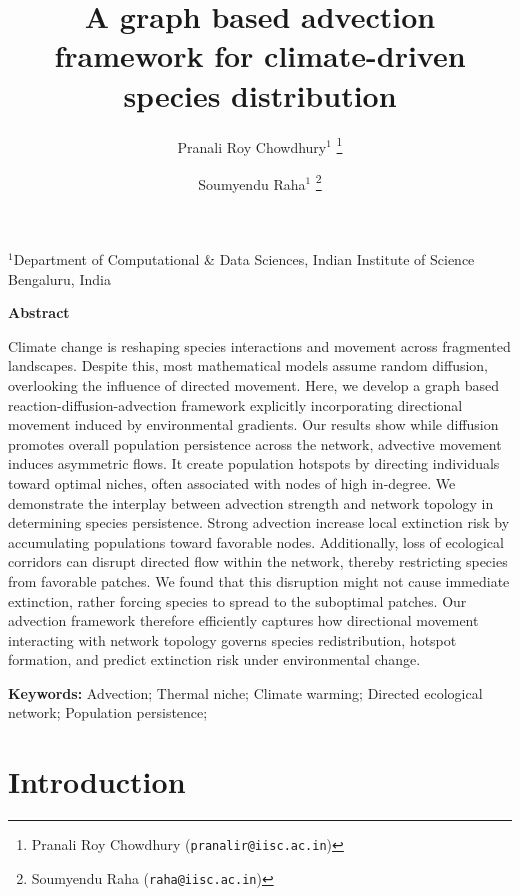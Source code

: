 \documentclass[12pt]{article}
\title{A graph based advection framework for climate-driven species distribution}
\author{
Pranali Roy Chowdhury$^1$ \thanks{ Pranali Roy Chowdhury (\texttt{pranalir@iisc.ac.in})} \and
Soumyendu Raha$^1$ \thanks{Soumyendu Raha (\texttt{raha@iisc.ac.in})}
}
\date{}
\begin{document}
\maketitle
\noindent{}  $^1$Department of Computational \& Data Sciences, Indian Institute of Science Bengaluru, India

\bigskip





\begin{center}
{\bf Abstract}
\end{center}
Climate change is reshaping species interactions and movement across fragmented landscapes. Despite this, most mathematical models assume random diffusion, overlooking the influence of directed movement. Here, we develop a graph based reaction-diffusion-advection framework explicitly incorporating directional movement induced by environmental gradients. Our results show while diffusion promotes overall population persistence across the network, advective movement induces asymmetric flows. It create population hotspots by directing individuals toward optimal niches, often associated with nodes of high in-degree. We demonstrate the interplay between advection strength and network topology in determining species persistence. Strong advection increase local extinction risk by accumulating populations toward favorable nodes. Additionally, loss of ecological corridors can disrupt directed flow within the network, thereby restricting species from favorable patches. We found that this disruption might not cause immediate extinction, rather forcing species to spread to the suboptimal patches.  Our advection framework therefore efficiently captures how directional movement interacting with network topology governs species redistribution, hotspot formation, and predict extinction risk under environmental change.




\vspace{1.0cm}
\noindent
{\bf Keywords:} Advection; Thermal niche; Climate warming; Directed ecological network; Population persistence;


\maketitle
\newpage

\section{Introduction}
\end{document}

